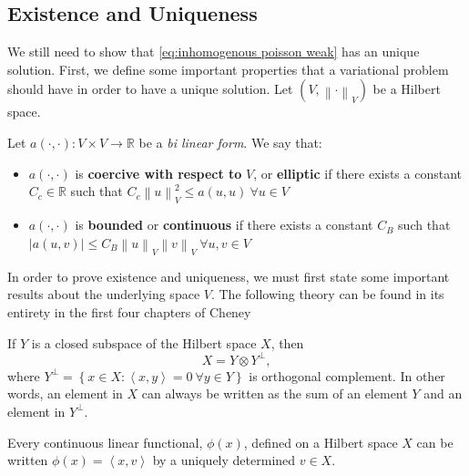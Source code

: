 \documentclass[../Main/main.tex]{subfiles}
\begin{document}
	\subsection{Existence and Uniqueness}

	We still need to show that \eqref{eq:inhomogenous poisson weak} has an unique solution.
	First, we define some important properties that a variational problem should have in order to have a unique solution. Let $(V,\left \| \cdot \right \|_V)$ be a Hilbert space.
	\begin{definition} Let $a(\cdot,\cdot):V\times V \rightarrow \mathbb{R}$ be a \emph{bi linear form}. We say that:
			\begin{itemize}
			\item $a(\cdot,\cdot)$ is \textbf{coercive with respect to }$V$, or \textbf{elliptic} if there exists a constant $C_c\in \mathbb{R}$ such that $C_c\left \| u \right \|_V^2 \leq a(u,u) \ \forall u \in V$
			\item $a(\cdot,\cdot)$ is \textbf{bounded} or \textbf{continuous} if there exists a constant $C_B$ such that $|a(u,v)|\leq C_B\left \| u \right \|_V\left \| v \right \|_V \ \forall u,v \in V$
			\end{itemize}
	\end{definition}
	In order to prove existence and uniqueness, we must first state some important results about the underlying space $V$. The following theory can be found in its entirety in the first four chapters of Cheney \cite{Cheney}
	\begin{theorem}\label{th:decomposition of hilbert}
		If $Y$ is a closed subspace of the Hilbert space $X$, then 
		\begin{equation*}
		X = Y\otimes Y^{\bot},
		\end{equation*}		
		where $Y^{\bot} = \left \{ \left. x\in X: \left \langle x,y \right \rangle=0 \ \forall y \in Y \right \} \right.$ is orthogonal complement. In other words, an element in $X$ can always be written as the sum of an element $Y$ and an element in $Y^{\bot}$.
	\end{theorem}
	\begin{theorem}\label{th:riesz representation}
		Every continuous linear functional, $\phi (x)$, defined on a Hilbert space $X$ can be written $\phi(x)= \left \langle x,v \right \rangle$ by a uniquely determined $v \in X$.
	\end{theorem}
\end{document}

